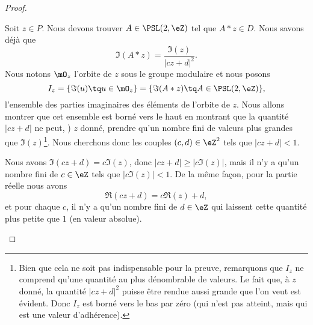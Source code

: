 \begin{proof}
\begin{subproof}
            Soit \( z\in P\). Nous devons trouver \( A\in\PSL(2,\eZ)\) tel que \( A*z\in D\). Nous savons déjà que
            \begin{equation}
                \Im(A*z)=\frac{ \Im(z) }{ | cz+d |^2 }.
            \end{equation}
            Nous notons \( \mO_z\) l'orbite de \( z\) sous le groupe modulaire et nous posons
            \begin{equation}
                I_z=\{ \Im(u)\tq u\in \mO_z \}=\{ \Im(A*z)\tq A\in\PSL(2,\eZ) \},
            \end{equation}
            l'ensemble des parties imaginaires des éléments de l'orbite de \( z\). Nous allons montrer que cet ensemble est borné vers le haut en montrant que la quantité \( | cz+d |\) ne peut, ) \( z\) donné, prendre qu'un nombre fini de valeurs plus grandes que \( \Im(z)\)\footnote{Bien que cela ne soit pas indispensable pour la preuve, remarquons que \( I_z\) ne comprend qu'une quantité au plus dénombrable de valeurs. Le fait que, à \( z\) donné, la quantité \( | cz+d |^2\) puisse être rendue aussi grande que l'on veut est évident. Donc \( I_z\) est borné vers le bas par zéro (qui n'est pas atteint, mais qui est une valeur d'adhérence).}. Nous cherchons donc les couples \( (c,d)\in \eZ^2\) tels que \( | cz+d |<1\). 

            Nous avons \( \Im(cz+d)=c\Im(z)\), donc \( | cz+d |\geq |c \Im(z) |\), mais il n'y a qu'un nombre fini de \( c\in \eZ\) tels que \( | c\Im(z) |<1\). De la même façon, pour la partie réelle nous avons
            \begin{equation}
                \Re(cz+d)=c\Re(z)+d,
            \end{equation}
            et pour chaque \( c\),  il n'y a qu'un nombre fini de \( d\in \eZ\) qui laissent cette quantité plus petite que \( 1\) (en valeur absolue).


\end{subproof}
\end{proof}
